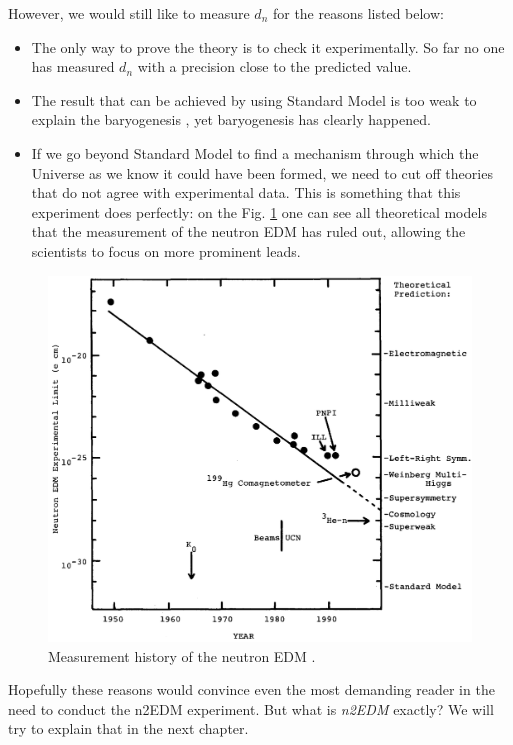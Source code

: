 However, we would still like to measure $d_n$ for the reasons listed below:
\begin{itemize}
	\item The only way to prove the theory is to check it experimentally. So far no one has measured $d_n$ with a precision close to the predicted value.
	\item The result that can be achieved by using Standard Model is too weak to explain the baryogenesis \cite{Dubbers2011}, yet baryogenesis has clearly happened.
	\item If we go beyond Standard Model to find a mechanism through which the Universe as we know it could have been formed, we need to cut off theories that do not agree with experimental data. This is something that this experiment does perfectly: on the Fig. \ref{fig:edm_history} one can see all theoretical models that the measurement of the neutron EDM has ruled out, allowing the scientists to focus on more prominent leads.
\end{itemize}

\begin{figure}[h]
	\includegraphics[width=\textwidth]{img/history_of_nedm_measurements}
	\caption{Measurement history of the neutron EDM \cite{Golub1994}.}
	\label{fig:edm_history}
\end{figure}

Hopefully these reasons would convince even the most demanding reader in the need to conduct the n2EDM experiment. But what is \textit{n2EDM} exactly? We will try to explain that in the next chapter.
